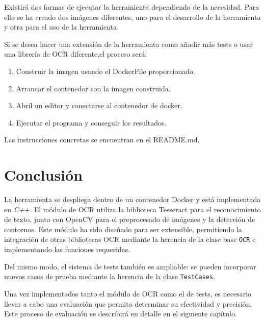 Existirá dos formas de ejecutar la herramienta dependiendo de la necesidad. Para ello se ha creado dos imágenes diferentes, uno para el desarrollo de la herramienta y otra para el uso de la herramienta.

Si se desea hacer una extensión de la herramienta como añadir más tests o usar una librería de OCR diferente,el proceso será:
\begin{enumerate}
	\item Construir la imagen usando el DockerFile proporcionado.
	\item Arrancar el contenedor con la imagen construida.
	\item Abril un editor y conectarse al contenedor de docker.
	\item Ejecutar el programa y conseguir los resultados.
\end{enumerate}
Las instrucciones concretas se encuentran en el README.md.
\section{Conclusión}
La herramienta se despliega dentro de un contenedor Docker y está implementada en \emph{C++}. El módulo de OCR utiliza la biblioteca Tesseract para el reconocimiento de texto, junto con OpenCV para el preprocesado de imágenes y la detección de contornos. Este módulo ha sido diseñado para ser extensible, permitiendo la integración de otras bibliotecas OCR mediante la herencia de la clase base \texttt{OCR} e implementando las funciones requeridas.

Del mismo modo, el sistema de tests también es ampliable: se pueden incorporar nuevos casos de prueba mediante la herencia de la clase \texttt{TestCases}.

Una vez implementados tanto el módulo de OCR como el de tests, es necesario llevar a cabo una evaluación que permita determinar su efectividad y precisión. Este proceso de evaluación se describirá en detalle en el siguiente capítulo.

